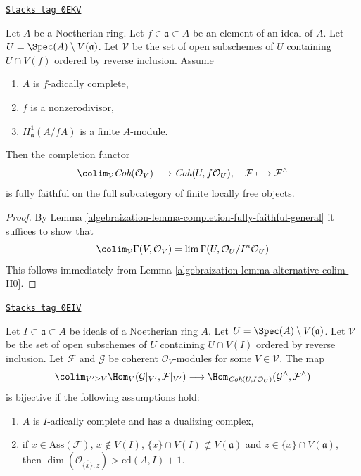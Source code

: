 \begin{lemma}
\label{algebraization-lemma-fully-faithful-general-alternative}
\href{https://stacks.math.columbia.edu/tag/0EKV}{\texttt{Stacks tag 0EKV}}

Let $A$ be a Noetherian ring. Let $f \in \mathfrak a \subset A$
be an element of an ideal of $A$. Let $U = \Spec(A) \setminus V(\mathfrak a)$.
Let $\mathcal{V}$ be the set of open subschemes of $U$ containing $U \cap V(f)$
ordered by reverse inclusion. Assume
\begin{enumerate}
\item $A$ is $f$-adically complete,
\item $f$ is a nonzerodivisor,
\item $H^1_\mathfrak a(A/fA)$ is a finite $A$-module.
\end{enumerate}
Then the completion functor
$$
\colim_\mathcal{V} \textit{Coh}(\mathcal{O}_V)
\longrightarrow
\textit{Coh}(U, f\mathcal{O}_U),
\quad
\mathcal{F} \longmapsto \mathcal{F}^\wedge
$$
is fully faithful on the full subcategory of finite locally free objects.
\end{lemma}

\begin{proof}

By Lemma \ref{algebraization-lemma-completion-fully-faithful-general}
it suffices to show that
$$
\colim_\mathcal{V} \Gamma(V, \mathcal{O}_V) =
\lim \Gamma(U, \mathcal{O}_U/I^n\mathcal{O}_U)
$$
This follows immediately from Lemma \ref{algebraization-lemma-alternative-colim-H0}.
\end{proof}

\begin{lemma}
\label{algebraization-lemma-fully-faithful-very-general}
\href{https://stacks.math.columbia.edu/tag/0EIV}{\texttt{Stacks tag 0EIV}}

Let $I \subset \mathfrak a \subset A$ be ideals of a Noetherian ring $A$.
Let $U = \Spec(A) \setminus V(\mathfrak a)$. Let $\mathcal{V}$ be the set
of open subschemes of $U$ containing $U \cap V(I)$ ordered by reverse
inclusion. Let $\mathcal{F}$ and
$\mathcal{G}$ be coherent $\mathcal{O}_V$-modules for some
$V \in \mathcal{V}$. The map
$$
\colim_{V' \geq V} \Hom_V(\mathcal{G}|_{V'}, \mathcal{F}|_{V'})
\longrightarrow
\Hom_{\textit{Coh}(U, I\mathcal{O}_U)}(\mathcal{G}^\wedge, \mathcal{F}^\wedge)
$$
is bijective if the following assumptions hold:
\begin{enumerate}
\item $A$ is $I$-adically complete and has a dualizing complex,
\item if $x \in \text{Ass}(\mathcal{F})$, $x \not \in V(I)$,
$\overline{\{x\}} \cap V(I) \not \subset V(\mathfrak a)$
and $z \in \overline{\{x\}} \cap V(\mathfrak a)$, then
$\dim(\mathcal{O}_{\overline{\{x\}}, z}) > \text{cd}(A, I) + 1$.
\end{enumerate}
\end{lemma}

